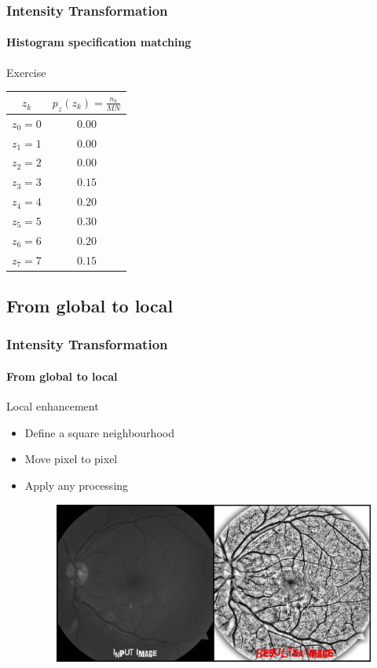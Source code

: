 \documentclass[table]{beamer}
\begin{document}
\begin{frame}
  \frametitle{Intensity Transformation}
  \framesubtitle{Histogram specification matching}
  \begin{block}{Exercise}\footnotesize
    \begin{center}
      \renewcommand{\arraystretch}{1.5}
      \begin{tabular}{|cc|}\hline
        \rowcolor{gray!20}
        $z_k$ & $p_z(z_k) = \frac{n_k}{MN}$ \\ \hline
        $z_0 = 0$ & $0.00$ \\
        $z_1 = 1$ & $0.00$ \\
        $z_2 = 2$ & $0.00$ \\
        $z_3 = 3$ & $0.15$ \\
        $z_4 = 4$ & $0.20$ \\
        $z_5 = 5$ & $0.30$ \\
        $z_6 = 6$ & $0.20$ \\
        $z_7 = 7$ & $0.15$ \\ \hline
      \end{tabular}
    \end{center}
  \end{block}
\end{frame}

\subsection{From global to local}

\begin{frame}
  \frametitle{Intensity Transformation}
  \framesubtitle{From global to local}
  \begin{block}{Local enhancement}\footnotesize
    \begin{itemize}
      \item Define a square neighbourhood
      \item Move pixel to pixel
      \item Apply any processing
        \begin{figure}
          \centering
          \includegraphics[width=.8\textwidth]{./images/local-histogram-equalization.jpg}
        \end{figure}
      \end{itemize}
  \end{block}
\end{frame}
\end{document}
